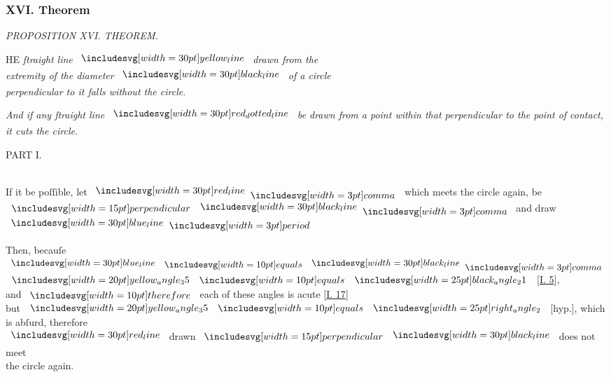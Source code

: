 \documentclass[12pt,preview]{standalone}
\begin{document}
\subsubsection{XVI. Theorem}

\begin{minipage}[t]{0.33\textwidth}
    \vspace{40pt}
    
\end{minipage}%
\hfill
\begin{minipage}[t]{0.64\textwidth}
    \vspace{0pt}

    \begin{center}
        \textit{PROPOSITION XVI. THEOREM.}\label{book3pr16} \\
    \end{center}

    \hfill

    \begin{center}
        \raggedright \lettrine[lines=4, loversize=1, nindent=0pt]{}{}HE \textit{ſtraight line} $\yellowline$ \textit{drawn from the\\ extremity of the diameter} $\blackline$ \textit{of a circle\\ perpendicular to it falls without the circle}.
    \end{center}

    \vspace{1ex}

    \raggedright \textit{And if any ſtraight line} $\dottedredline$ \textit{be drawn from a point within that perpendicular to the point of contact, it cuts the circle}.

    \hfill

    \hfill

    \begin{center}
        PART I.\\
        \hfill\\
        \raggedright If it be poſſible, let $\redline \bcomma$ which meets the circle again, be $\bperp \blackline \bcomma$ and draw $\blueline \bperiod$
    \end{center}

    \hfill

    \begin{center}
        Then, becauſe $\blueline \bequals \blackline \bcomma$\\
        $\img[0][0][20]{yellow_angle_35} \bequals \img{black_angle_21}$ [\hyperref[book1pr5]{\textsc{I.} 5}],\\
        and $\btherefore$ each of these angles is acute [\hyperref[book1pr17]{\textsc{I.} 17}]\\
        but $\img[0][0][20]{yellow_angle_35} \bequals \img{right_angle_2}$ [hyp.], which is abſurd, therefore\\
        $\redline$ drawn $\bperp \blackline$ does not meet\\
        the circle again.
    \end{center}
\end{minipage}%
\end{document}
